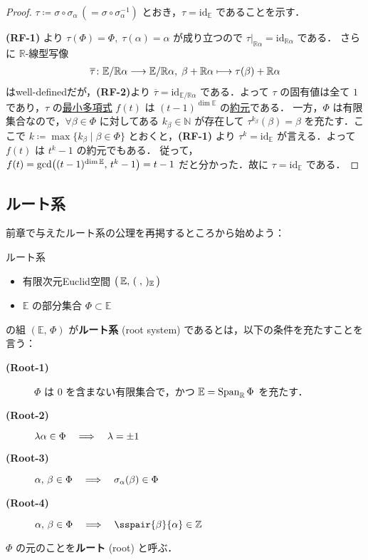 \documentclass[rep_main]{subfiles}
\begin{document}
\begin{proof}
	$\tau \coloneqq \sigma \circ \sigma_\alpha \, (= \sigma \circ \sigma_\alpha^{-1})$ とおき，$\tau = \mathrm{id}_{\mathbb{E}}$ であることを示す．

	\textsf{\textbf{(RF-1)}} より $\tau(\Phi) = \Phi,\; \tau(\alpha) = \alpha$ が成り立つので $\tau|_{\mathbb{R}\alpha} = \mathrm{id}_{\mathbb{R}\alpha}$ である．
	さらに $\mathbb{R}$-線型写像
	\begin{align}
		\overline{\tau} \colon \mathbb{E}/\mathbb{R}\alpha \longrightarrow \mathbb{E}/\mathbb{R}\alpha,\; \beta + \mathbb{R}\alpha \longmapsto \tau(\beta) + \mathbb{R}\alpha
	\end{align}
	はwell-definedだが，\textsf{\textbf{(RF-2)}}より $\overline{\tau} = \mathrm{id}_{ \mathbb{E}/\mathbb{R}\alpha}$ である．よって $\tau$ の固有値は全て $1$ であり，$\tau$ の\hyperref[def:minimal-poly]{最小多項式} $f(t)$ は $(t-1)^{\dim \mathbb{E}}$ の\hyperref[def:domain-basic]{約元}である．
	一方，$\Phi$ は有限集合なので，$\forall \beta \in \Phi$ に対してある $k_\beta \in \mathbb{N}$ が存在して $\tau^{k_\beta}(\beta) = \beta$ を充たす．ここで $k \coloneqq \max \{k_\beta\mid \beta \in \Phi\}$ とおくと，\textsf{\textbf{(RF-1)}} より $\tau^k = \mathrm{id}_{\mathbb{E}}$ が言える．よって $f(t)$ は $t^k - 1$ の約元でもある．
	従って，$f(t) = \operatorname{gcd} \bigl( (t-1)^{\dim \mathbb{E}},\, t^k - 1 \bigr) = t-1$ だと分かった．故に $\tau = \mathrm{id}_{\mathbb{E}}$ である．
\end{proof}


\subsection{ルート系}

前章で与えたルート系の公理を再掲するところから始めよう：

\begin{myaxiom}[label=ax:root-system,breakable]{ルート系}
	\begin{itemize}
		\item 有限次元Euclid空間 $\bigl(\, \mathbb{E},\, (\;,\,)_{\mathbb{E}}\,\bigr)$ 
		\item $\mathbb{E}$ の部分集合 $\Phi \subset \mathbb{E}$
	\end{itemize}
	の組 $(\mathbb{E},\, \Phi)$ が\textbf{ルート系} (root system) であるとは，以下の条件を充たすことを言う：
	\begin{description}
		\item[\textbf{(Root-1)}] $\Phi$ は $0$ を含まない有限集合で，かつ $\mathbb{E} = \operatorname{Span}_{\mathbb{R}} \Phi$ を充たす．
		\item[\textbf{(Root-2)}] $\lambda \alpha \in \Phi \quad \Longrightarrow \quad \lambda = \pm 1$
		\item[\textbf{(Root-3)}] $\alpha,\, \beta \in \Phi \quad \Longrightarrow \quad \sigma_\alpha(\beta) \in \Phi$
		\item[\textbf{(Root-4)}] $\alpha,\, \beta \in \Phi \IMP \sspair{\beta}{\alpha} \in \mathbb{Z}$
	\end{description}
	\tcblower
	$\Phi$ の元のことを\textbf{ルート} (root) と呼ぶ．
\end{myaxiom}
\end{document}

